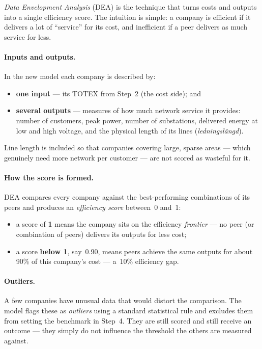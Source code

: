 \emph{Data Envelopment Analysis} (DEA) is the technique that turns costs and
outputs into a single efficiency score. The intuition is simple: a company is
efficient if it delivers a lot of ``service'' for its cost, and inefficient if a
peer delivers as much service for less.

\paragraph{Inputs and outputs.}
In the new model each company is described by:
\begin{itemize}
  \item \textbf{one input} --- its TOTEX from Step~2 (the cost side); and
  \item \textbf{several outputs} --- measures of how much network service it
        provides: number of customers, peak power, number of substations,
        delivered energy at low and high voltage, and the physical length of its
        lines (\emph{ledningslängd}).
\end{itemize}
Line length is included so that companies covering large, sparse areas --- which
genuinely need more network per customer --- are not scored as wasteful for it.

\paragraph{How the score is formed.}
DEA compares every company against the best-performing combinations of its peers
and produces an \emph{efficiency score} between~0 and~1:

\begin{itemize}
  \item a score of \textbf{1} means the company sits on the efficiency
        \emph{frontier} --- no peer (or combination of peers) delivers its outputs
        for less cost;
  \item a score \textbf{below 1}, say~0.90, means peers achieve the same outputs
        for about 90\% of this company's cost --- a~10\% efficiency gap.
\end{itemize}

\paragraph{Outliers.}
A few companies have unusual data that would distort the comparison. The model
flags these as \emph{outliers} using a standard statistical rule and excludes them
from setting the benchmark in Step~4. They are still scored and still receive an
outcome --- they simply do not influence the threshold the others are measured
against.

